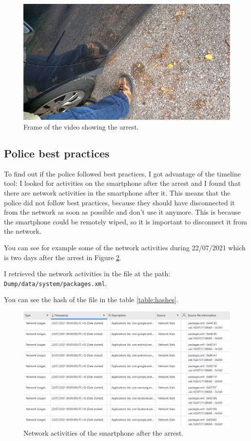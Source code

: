 \documentclass[12pt]{article}
\begin{document}
\begin{figure}[!ht]
    \centering
    \includegraphics[width=\textwidth]{images/arrest-frame.png}
    \caption{Frame of the video showing the arrest.}
    \label{fig:rec-file}
\end{figure}

\subsection{Police best practices}

To find out if the police followed best practices, I got advantage of the timeline tool: I looked for activities on the smartphone after the arrest and I found that there are network activities in the smartphone after it. This means that the police did not follow best practices, because they should have disconnected it from the network as soon as possible and don't use it anymore. This is because the smartphone could be remotely wiped, so it is important to disconnect it from the network.

You can see for example some of the network activities during 22/07/2021 which is two days after the arrest in Figure \ref{fig:pbp}.

I retrieved the network activities in the file at the path:\\ \texttt{Dump/data/system/packages.xml}.

You can see the hash of the file in the table \ref{table:hashes}.

\begin{figure}[!ht]
    \centering
    \includegraphics[width=\textwidth]{images/pbp.png}
    \caption{Network activities of the smartphone after the arrest.}
    \label{fig:pbp}
\end{figure}
\end{document}
